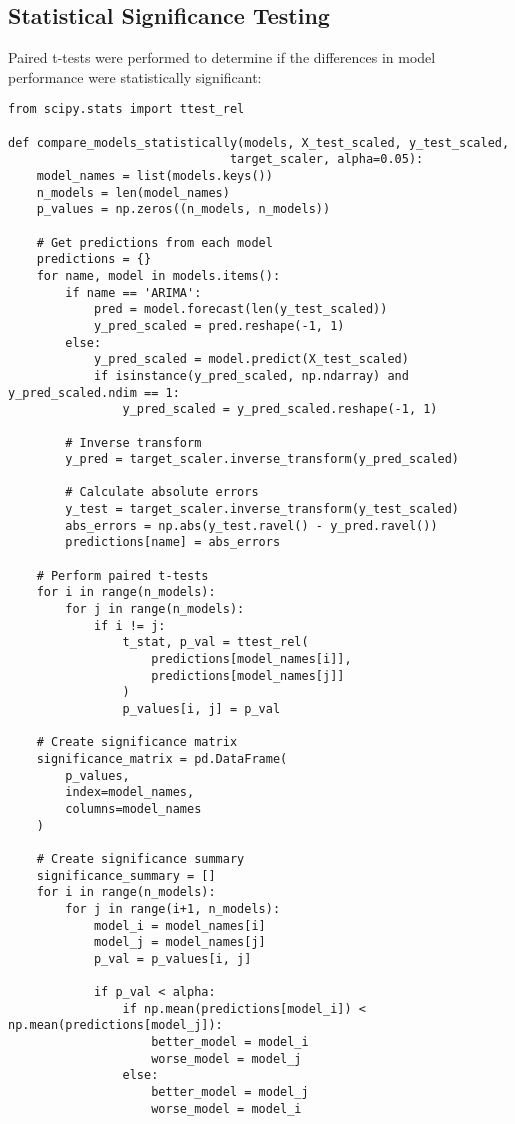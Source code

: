 \documentclass[12pt]{article}
\begin{document}
\subsection{Statistical Significance Testing}
\label{subsec:significance_testing}

Paired t-tests were performed to determine if the differences in model performance were statistically significant:

\begin{verbatim}
from scipy.stats import ttest_rel

def compare_models_statistically(models, X_test_scaled, y_test_scaled, 
                               target_scaler, alpha=0.05):
    model_names = list(models.keys())
    n_models = len(model_names)
    p_values = np.zeros((n_models, n_models))
    
    # Get predictions from each model
    predictions = {}
    for name, model in models.items():
        if name == 'ARIMA':
            pred = model.forecast(len(y_test_scaled))
            y_pred_scaled = pred.reshape(-1, 1)
        else:
            y_pred_scaled = model.predict(X_test_scaled)
            if isinstance(y_pred_scaled, np.ndarray) and y_pred_scaled.ndim == 1:
                y_pred_scaled = y_pred_scaled.reshape(-1, 1)
        
        # Inverse transform
        y_pred = target_scaler.inverse_transform(y_pred_scaled)
        
        # Calculate absolute errors
        y_test = target_scaler.inverse_transform(y_test_scaled)
        abs_errors = np.abs(y_test.ravel() - y_pred.ravel())
        predictions[name] = abs_errors
    
    # Perform paired t-tests
    for i in range(n_models):
        for j in range(n_models):
            if i != j:
                t_stat, p_val = ttest_rel(
                    predictions[model_names[i]],
                    predictions[model_names[j]]
                )
                p_values[i, j] = p_val
    
    # Create significance matrix
    significance_matrix = pd.DataFrame(
        p_values,
        index=model_names,
        columns=model_names
    )
    
    # Create significance summary
    significance_summary = []
    for i in range(n_models):
        for j in range(i+1, n_models):
            model_i = model_names[i]
            model_j = model_names[j]
            p_val = p_values[i, j]
            
            if p_val < alpha:
                if np.mean(predictions[model_i]) < np.mean(predictions[model_j]):
                    better_model = model_i
                    worse_model = model_j
                else:
                    better_model = model_j
                    worse_model = model_i
                

\end{verbatim}
\end{document}

